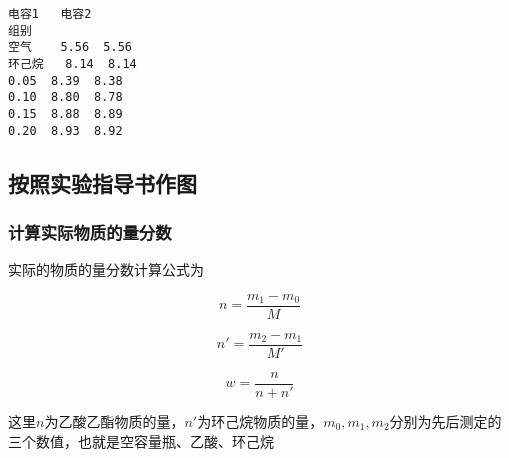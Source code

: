 \documentclass[a4paper]{ctexart}
\makeatletter
\newcommand{\boxspacing}{\kern\kvtcb@left@rule\kern\kvtcb@boxsep}
\newcommand{\prompt}[4]{
        {\ttfamily\llap{{\color{#2}[#3]:\hspace{3pt}#4}}\vspace{-\baselineskip}}
    }
\makeatother
\begin{document}
            \begin{tcolorbox}[breakable, size=fbox, boxrule=.5pt, pad at break*=1mm, opacityfill=0]
\prompt{Out}{outcolor}{7}{\boxspacing}
\begin{Verbatim}[commandchars=\\\{\}]
       电容1   电容2
组别
空气    5.56  5.56
环己烷   8.14  8.14
0.05  8.39  8.38
0.10  8.80  8.78
0.15  8.88  8.89
0.20  8.93  8.92
\end{Verbatim}
\end{tcolorbox}
        
    \hypertarget{ux6309ux7167ux5b9eux9a8cux6307ux5bfcux4e66ux4f5cux56fe}{%
\subsection{按照实验指导书作图}\label{ux6309ux7167ux5b9eux9a8cux6307ux5bfcux4e66ux4f5cux56fe}}

    \hypertarget{ux8ba1ux7b97ux5b9eux9645ux7269ux8d28ux7684ux91cfux5206ux6570}{%
\subsubsection{计算实际物质的量分数}\label{ux8ba1ux7b97ux5b9eux9645ux7269ux8d28ux7684ux91cfux5206ux6570}}

实际的物质的量分数计算公式为

\[
n = \frac{m_1 - m_0}{M} 
\]

\[
n' = \frac{m_2 - m_1}{M'} 
\]

\[
w = \frac{n}{n + n'}
\]

这里\(n\)为乙酸乙酯物质的量，\(n'\)为环己烷物质的量，\(m_0, m_1, m_2\)分别为先后测定的三个数值，也就是空容量瓶、乙酸、环己烷
\end{document}
